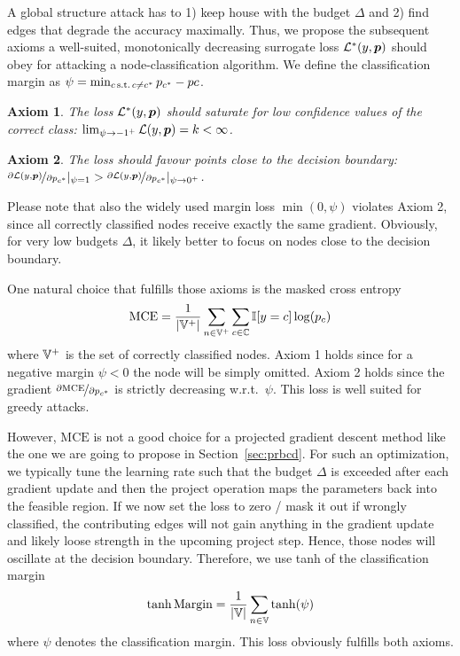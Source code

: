 \documentclass[sigconf,authordraft]{acmart}
\newtheorem{axiom}{Axiom}
\begin{document}
A global structure attack has to 1) keep house with the budget \(\Delta\) and 2) find edges that degrade the accuracy maximally. Thus, we propose the subsequent axioms a well-suited, monotonically decreasing surrogate loss \(\mathcal{L^*}(y, {\bm{p}})\) should obey for attacking a node-classification algorithm. We define the classification margin as \(\psi = \min_{c \,\text{s.t.}\, c \ne c^*} {p}_{c^*} - {p}{c}\).
\begin{axiom}\label{axiom:axiom1}
  The loss \(\mathcal{L^*}(y, {\bm{p}})\) should saturate for low confidence values of the correct class: \(\lim_{\psi \to -1^+} \mathcal{L}(y, {\bm{p}}) = k < \infty\).
\end{axiom}
\begin{axiom}\label{axiom:axiom2}
  The loss should favour points close to the decision boundary: \(\nicefrac{\partial \mathcal{L}(y, {\bm{p}})}{\partial {p}_{c^*}} |_{\psi = 1}  > \nicefrac{\partial \mathcal{L}(y, {\bm{p}})}{\partial {p}_{c^*}} |_{\psi \to 0^+}\).
\end{axiom}
Please note that also the widely used margin loss \(\min(0, \psi)\) violates Axiom 2, since all correctly classified nodes receive exactly the same gradient. Obviously, for very low budgets \(\Delta\), it likely better to focus on nodes close to the decision boundary.

One natural choice that fulfills those axioms is the masked cross entropy
\begin{equation}\label{eq:mce}
  \text{MCE} = \frac{1}{|{\mathbb{V}}^+|} \sum_{n \in {\mathbb{V}}^+} \sum_{c \in {\mathbb{C}}} \mathbb{I}[y = c] \log({p}_{c})
\end{equation}
where \({\mathbb{V}}^+\) is the set of correctly classified nodes. Axiom 1 holds since for a negative margin \(\psi < 0\) the node will be simply omitted. Axiom 2 holds since the gradient \(\nicefrac{\partial \text{MCE}}{\partial {p}_{c^*}}\) is strictly decreasing w.r.t.\ \(\psi\). This loss is well suited for greedy attacks.

However, \(\text{MCE}\) is not a good choice for a projected gradient descent method like the one we are going to propose in Section~\ref{sec:prbcd}. For such an optimization, we typically tune the learning rate such that the budget \(\Delta\) is exceeded after each gradient update and then the project operation maps the parameters back into the feasible region. If we now set the loss to zero / mask it out if wrongly classified, the contributing edges will not gain anything in the gradient update and likely loose strength in the upcoming project step. Hence, those nodes will oscillate at the decision boundary. Therefore, we use tanh of the classification margin
\begin{equation}\label{eq:mce}
  \tanh\text{Margin} = \frac{1}{|{\mathbb{V}}|} \sum_{n \in {\mathbb{V}}} \tanh(\psi)
\end{equation}
where \(\psi\) denotes the classification margin. This loss obviously fulfills both axioms.
\end{document}
